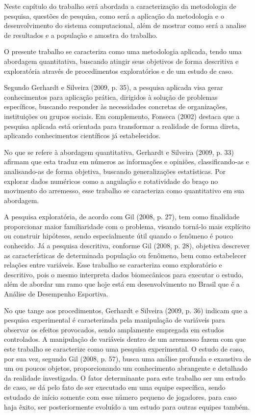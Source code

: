 \label{cap:procedimentos-metodologicos-tecnicos}

Neste capítulo do trabalho será abordada a caracterização da metodologia de pesquisa, questões de pesquisa,
como será a aplicação da metodologia e o desenvolvimento do sistema computacional, além de mostrar como será a analise de resultados e a população e amostra do trabalho.

\label{sec:caracterizacao-metodologia-pesquisa}
    
O presente trabalho se caracteriza como uma metodologia aplicada, tendo uma abordagem quantitativa, buscando atingir seus objetivos de forma descritiva e exploratória através de procedimentos exploratórios e de um estudo de caso.

Segundo Gerhardt e Silveira (2009, p. 35), a pesquisa aplicada visa gerar conhecimentos para aplicação prática, dirigidos à solução de problemas específicos, buscando responder às necessidades concretas de organizações, instituições ou grupos sociais. 
Em complemento, Fonseca (2002) destaca que a pesquisa aplicada está orientada para transformar a realidade de forma direta, aplicando conhecimentos científicos já estabelecidos.

No que se refere à abordagem quantitativa, Gerhardt e Silveira (2009, p. 33) afirmam que esta traduz em números as informações e opiniões, classificando-as e analisando-as de forma objetiva, buscando generalizações estatísticas. Por explorar dados numéricos como a angulação e rotatividade do braço no movimento do arremesso, esse trabalho se caracteriza como quantitativo em sua abordagem.

A pesquisa exploratória, de acordo com Gil (2008, p. 27), tem como finalidade proporcionar maior familiaridade com o problema, visando torná-lo mais explícito ou construir hipóteses, sendo especialmente útil quando o fenômeno é pouco conhecido. 
Já a pesquisa descritiva, conforme Gil (2008, p. 28), objetiva descrever as características de determinada população ou fenômeno, bem como estabelecer relações entre variáveis. Esse trabalho se caracteriza como exploratório e descritivo, pois o mesmo interpreta dados biomecânicos para executar o estudo, além de abordar um ramo que hoje está em desenvolvimento no Brasil que é a Análise de Desempenho Esportiva.

No que tange aos procedimentos, Gerhardt e Silveira (2009, p. 36) indicam que a pesquisa experimental é caracterizada pela manipulação de variáveis para observar os efeitos provocados, sendo amplamente empregada em estudos controlados. A manipulação de variáveis dentro de um arremesso fazem com que este trabalho se caracterize como uma pesquisa experimental.
O estudo de caso, por sua vez, segundo Gil (2008, p. 57), busca uma análise profunda e exaustiva de um ou poucos objetos, proporcionando um conhecimento abrangente e detalhado da realidade investigada. O fator determinante para este trabalho ser um estudo de caso, se dá pelo fato de ser executado em uma equipe específica, sendo estudado de início somente com esse número pequeno de jogadores, para caso haja êxito, ser posteriormente evoluído a um estudo para outras equipes também.


